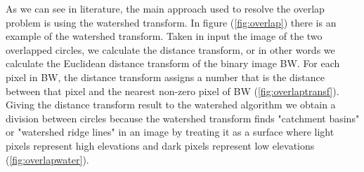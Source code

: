 \bigskip

As we can see in literature, the main approach used to resolve the overlap problem is using the watershed transform. In figure (\ref{fig:overlap}) there is an example of the watershed transform. Taken in input the image of the two overlapped circles, we calculate the distance transform, or in other words we calculate the Euclidean distance transform of the binary image BW. For each pixel in BW, the distance transform assigns a number that is the distance between that pixel and the nearest non-zero pixel of BW (\ref{fig:overlaptransf}). Giving the distance transform result to the watershed algorithm we obtain a division between circles because the watershed transform finds "catchment basins" or "watershed ridge lines" in an image by treating it as a surface where light pixels represent high elevations and dark pixels represent low elevations (\ref{fig:overlapwater}).
